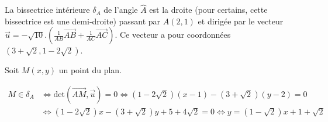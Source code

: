 {\begin{enumerate}
{La bissectrice intérieure $\delta_A$ de l'angle $\widehat{A}$ est la droite (pour certains, cette bissectrice est une demi-droite) passant par $A(2,1)$ et dirigée par le vecteur $\vec{u}=-\sqrt{10}.(\frac{1}{AB}\overrightarrow{AB}+\frac{1}{AC}\overrightarrow{AC})$. Ce vecteur a pour coordonnées $(3+\sqrt{2},1-2\sqrt{2})$.

Soit $M(x,y)$ un point du plan.

\begin{align*}
M\in\delta_A&\Leftrightarrow\mbox{det}(\overrightarrow{AM},\vec{u})=0\Leftrightarrow(1-2\sqrt{2})(x-1)-(3+\sqrt{2})(y-2)=0\\
 &\Leftrightarrow(1-2\sqrt{2})x-(3+\sqrt{2})y+5+4\sqrt{2}=0\Leftrightarrow y=(1-\sqrt{2})x+1+\sqrt{2}
\end{align*}
}
\end{enumerate}
}
